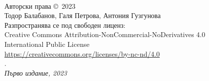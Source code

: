 ~\vfill
\thispagestyle{empty}

\noindent Авторски права \copyright\ 2023 \\

\noindent Тодор Балабанов, Галя Петрова, Антония Гузгунова \\ 


\noindent Разпространява се под свободен лиценз: \\ 
Creative Commons Attribution-NonCommercial-NoDerivatives 4.0 \\
International Public License \\
\url{https://creativecommons.org/licenses/by-nc-nd/4.0} \\

. \\

\noindent \textit{Първо издание, 2023}
